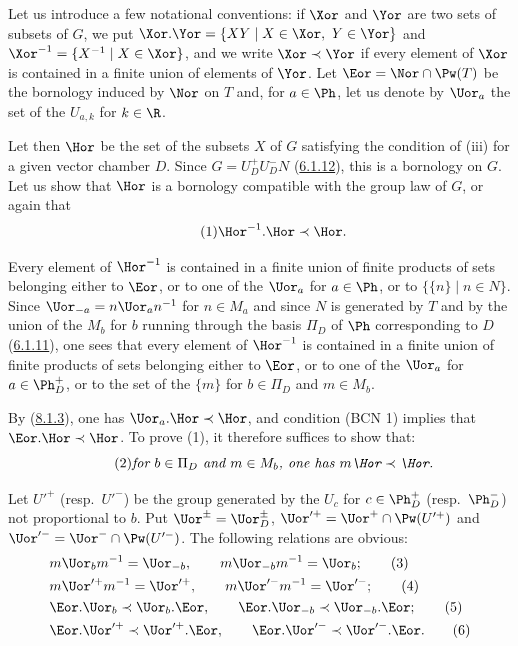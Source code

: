 \documentclass[12pt,a4paper,oneside,english]{smfart}
\makeatletter
\newcommand{\btpageanchor}[1]{\Hy@raisedlink{\hypertarget{p:#1}{}}}
\newcommand{\btref}[1]{\hyperlink{bt:#1}{#1}}
\newcommand{\btpage}[1]{\marginnote{p.~#1}\btpageanchor{#1}}
\newcommand{\pg}[1]{\btpage{#1}}
\theoremstyle{definition}
\theoremstyle{bt}
\makeatother
\begin{document}
Let us introduce a few notational conventions: if $\Xor$ and $\Yor$ are two sets of
subsets of $G$, we put $\Xor.\Yor=\{XY\mid X\in\Xor,\ Y\in\Yor\}$ and
$\Xor^{-1}=\{X^{-1}\mid X\in\Xor\}$, and we write $\Xor\prec\Yor$ if every element of
$\Xor$ is contained in a finite union of elements of $\Yor$. Let $\Eor=\Nor\cap\Pw(T)$
be the bornology induced by $\Nor$ on $T$ and, for $a\in\Ph$, let us denote by $\Uor_a$
the set of the $U_{a,k}$ for $k\in\R$.

\pg{189}
Let then $\Hor$ be the set of the subsets $X$ of $G$ satisfying the condition of (iii)
for a given vector chamber $D$. Since $G=U^+_DU^-_DN$ (\btref{6.1.12}), this is a bornology on
$G$. Let us show that $\Hor$ is a bornology compatible with the group law of $G$, or
again that
\begin{equation}\tag{1}
\Hor^{-1}.\Hor\prec\Hor .
\end{equation}

Every element of $\Hor^{-1}$ is contained in a finite union of finite products of sets
belonging either to $\Eor$, or to one of the $\Uor_a$ for $a\in\Ph$, or to
$\{\{n\}\mid n\in N\}$. Since $\Uor_{-a}=n\Uor_an^{-1}$ for $n\in M_a$ and since $N$ is
generated by $T$ and by the union of the $M_b$ for $b$ running through the basis $\Pi_D$
of $\Ph$ corresponding to $D$ (\btref{6.1.11}), one sees that every element of $\Hor^{-1}$ is
contained in a finite union of finite products of sets belonging either to $\Eor$, or to
one of the $\Uor_a$ for $a\in\Ph^+_D$, or to the set of the $\{m\}$ for $b\in\Pi_D$ and
$m\in M_b$.

By (\btref{8.1.3}), one has $\Uor_a.\Hor\prec\Hor$, and condition (BCN 1) implies that
$\Eor.\Hor\prec\Hor$. To prove (1), it therefore suffices to show that:
\begin{equation}\tag{2}
\text{\itshape for $b\in\Pi_D$ and $m\in M_b$, one has $m\Hor\prec\Hor$.}
\end{equation}

Let $U'^+$ (resp.\ $U'^-$) be the group generated by the $U_c$ for $c\in\Ph^+_D$
(resp.\ $\Ph^-_D$) not proportional to $b$. Put $\Uor^\pm=\Uor^\pm_D$,
$\Uor'^+=\Uor^+\cap\Pw(U'^+)$ and $\Uor'^-=\Uor^-\cap\Pw(U'^-)$. The following
relations are obvious:
\begin{align}
&m\Uor_bm^{-1}=\Uor_{-b},\qquad m\Uor_{-b}m^{-1}=\Uor_b;\tag{3}\\
&m\Uor'^+m^{-1}=\Uor'^+,\qquad m\Uor'^-m^{-1}=\Uor'^-;\tag{4}\\
&\Eor.\Uor_b\prec\Uor_b.\Eor,\qquad \Eor.\Uor_{-b}\prec\Uor_{-b}.\Eor;\tag{5}\\
&\Eor.\Uor'^+\prec\Uor'^+.\Eor,\qquad \Eor.\Uor'^-\prec\Uor'^-.\Eor.\tag{6}
\end{align}
\end{document}
